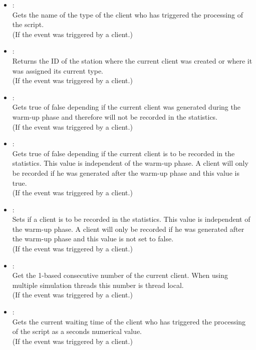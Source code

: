 \begin{itemize}

\item
{}:\\
Gets the name of the type of the client who has triggered the processing of the script.\\
(If the event was triggered by a client.)

\item
{}:\\
Returns the ID of the station where the current client was created or where it was assigned its current type.\\
(If the event was triggered by a client.)

\item
{}:\\
Gets true of false depending if the current client was generated during the warm-up phase and
therefore will not be recorded in the statistics.\\
(If the event was triggered by a client.)

\item
{}:\\
Gets true of false depending if the current client is to be recorded in the statistics.
This value is independent of the warm-up phase. A client will only be recorded if he was
generated after the warm-up phase and this value is true.\\
(If the event was triggered by a client.)

\item
{}:\\
Sets if a client is to be recorded in the statistics.
This value is independent of the warm-up phase. A client will only be recorded if he was
generated after the warm-up phase and this value is not set to false.\\
(If the event was triggered by a client.)

\item
{}:\\
Get the 1-based consecutive number of the current client.
When using multiple simulation threads this number is thread local.\\
(If the event was triggered by a client.)

\item
{}:\\
Gets the current waiting time of the client who has triggered the processing of the script as a seconds numerical value.\\
(If the event was triggered by a client.)


\end{itemize}
